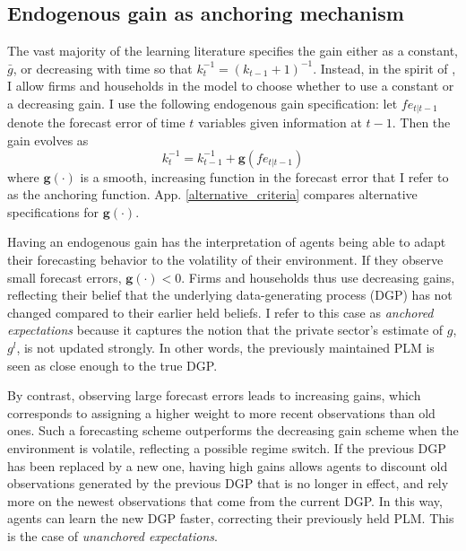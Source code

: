 \documentclass[11pt]{article}
\renewcommand{\[}{\begin{equation}}
\renewcommand{\]}{\end{equation}}
\begin{document}
\subsection{Endogenous gain as anchoring mechanism}

The vast majority of the learning literature specifies the gain either as a constant, $\bar{g}$, or decreasing with time so that $k_t^{-1} = (k_{t-1}+1)^{-1}$. Instead, in the spirit of \cite{carvalho2019anchored}, I allow firms and households in the model to choose whether to use a constant or a decreasing gain. I use the following endogenous gain specification: let $fe_{t|t-1}$ denote the forecast error of time $t$ variables given information at $t-1$. Then the gain evolves as
\begin{equation}
k_t^{-1}  = k_{t-1}^{-1} + \mathbf{g}(fe_{t|t-1}) 
\label{anchoring}
\end{equation}
where $\mathbf{g(\cdot)}$ is a smooth, increasing function in the forecast error that I refer to as the anchoring function. App. \ref{alternative_criteria} compares alternative specifications for $\mathbf{g(\cdot)}$.

Having an endogenous gain has the interpretation of agents being able to adapt their forecasting behavior to the volatility of their environment. If they observe small forecast errors, $\mathbf{g(\cdot)} < 0$.  Firms and households thus use decreasing gains, reflecting their belief that the underlying data-generating process (DGP) has not changed compared to their earlier held beliefs. I refer to this case as \emph{anchored expectations} because it captures the notion that the private sector's estimate of $g$, $g^l$, is not updated strongly. In other words, the previously maintained PLM is seen as close enough to the true DGP. 

By contrast, observing large forecast errors leads to increasing gains, which corresponds to assigning a higher weight to more recent observations than old ones. Such a forecasting scheme outperforms the decreasing gain scheme when the environment is volatile, reflecting a possible regime switch. If the previous DGP has been replaced by a new one, having high gains allows agents to discount old observations generated by the previous DGP that is no longer in effect, and rely more on the newest observations that come from the current DGP. In this way, agents can learn the new DGP faster, correcting their previously held PLM. This is the case of \emph{unanchored expectations}. 
\end{document}
